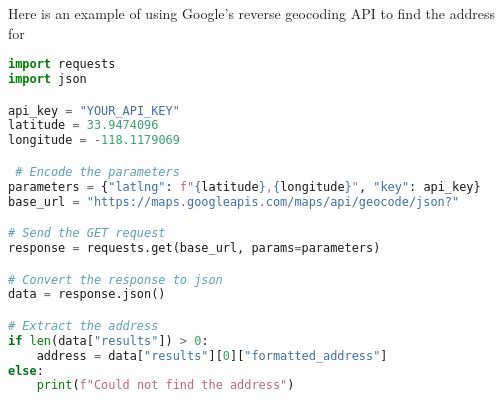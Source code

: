 Here is an example of using Google's reverse geocoding API to find the
address for

\begin{lstlisting}[language=Python]
import requests
import json

api_key = "YOUR_API_KEY"
latitude = 33.9474096
longitude = -118.1179069

 # Encode the parameters
parameters = {"latlng": f"{latitude},{longitude}", "key": api_key}
base_url = "https://maps.googleapis.com/maps/api/geocode/json?"

# Send the GET request
response = requests.get(base_url, params=parameters)

# Convert the response to json
data = response.json()

# Extract the address
if len(data["results"]) > 0:
    address = data["results"][0]["formatted_address"]
else:
    print(f"Could not find the address")
\end{lstlisting}
